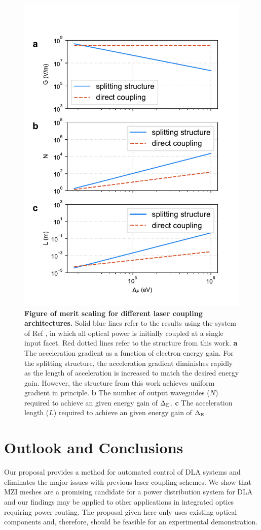 \begin{figure}[!h]
\centering
\includegraphics[width=0.7\columnwidth]{figures/MZI_param}
\caption{\label{fig:plots} \textbf{Figure of merit scaling for different laser coupling architectures.} Solid blue lines refer to the results using the system of Ref \cite{hughes_-chip_2018}, in which all optical power is initially coupled at a single input facet. Red dotted lines refer to the structure from this work.  \textbf{a}  The acceleration gradient as a function of electron energy gain.  For the splitting structure, the acceleration gradient diminishes rapidly as the length of acceleration is increased to match the desired energy gain.  However, the structure from this work achieves uniform gradient in principle.  \textbf{b}  The number of output waveguides ($N$) required to achieve an given energy gain of $\Delta_\textrm{E}$.  \textbf{c}  The acceleration length ($L$) required to achieve an given energy gain of $\Delta_\textrm{E}$.}
\end{figure}

\section{\label{sec:discussion}Outlook and Conclusions}

Our proposal provides a method for automated control of DLA systems and eliminates the major issues with previous laser coupling schemes.  We show that MZI meshes are a promising candidate for a power distribution system for DLA and our findings may be applied to other applications in integrated optics requiring power routing.  The proposal given here only uses existing optical components and, therefore, should be feasible for an experimental demonstration.

